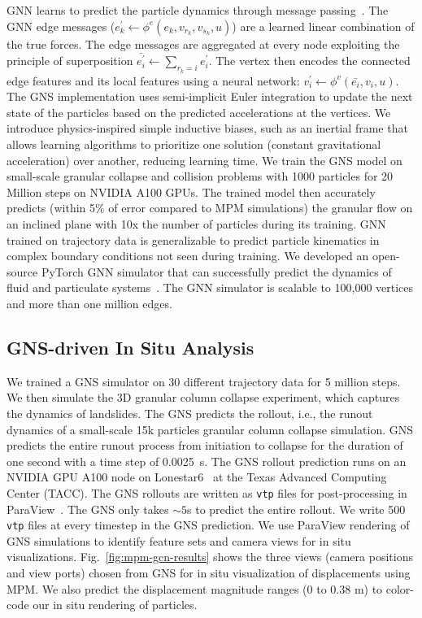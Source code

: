 \documentclass{vgtc}
\newcommand{\code}[1]{\texttt{#1}}
\begin{document}
GNN learns to predict the particle dynamics through message passing~\cite{sanchez2020learning}.  The GNN edge messages  ($e^\prime_k \leftarrow \phi^e(e_k, v_{r_k}, v_{s_k}, u)$) are a learned linear combination of the true forces.  The edge messages are aggregated at every node exploiting the principle of superposition $\bar{e_i^\prime} \leftarrow \sum_{r_k = i} e_i^\prime$.  The vertex then encodes the connected edge features and its local features using a neural network: $v_i^\prime \leftarrow \phi^v (\bar{e_i}, v_i, u)$.  The GNS implementation uses semi-implicit Euler integration to update the next state of the particles based on the predicted accelerations at the vertices.  We introduce physics-inspired simple inductive biases, such as an inertial frame that allows learning algorithms to prioritize one solution (constant gravitational acceleration) over another, reducing learning time.  We train the GNS model on small-scale granular collapse and collision problems with 1000 particles for 20 Million steps on NVIDIA A100 GPUs.  The trained model then accurately predicts (within 5\% of error compared to MPM simulations) the granular flow on an inclined plane with 10x the number of particles during its training.  GNN trained on trajectory data is generalizable to predict particle kinematics in complex boundary conditions not seen during training.  We developed an open-source PyTorch GNN simulator that can successfully predict the dynamics of fluid and particulate systems~\cite{Kumar_Graph_Network_Simulator_2022}.  The GNN simulator is scalable to 100,000 vertices and more than one million edges.


\subsection{GNS-driven In Situ Analysis}


We trained a GNS simulator on 30 different trajectory data for 5 million steps.  We then simulate the 3D granular column collapse experiment, which captures the dynamics of landslides.  The GNS predicts the rollout, i.e., the runout dynamics of a small-scale 15k particles granular column collapse simulation.  GNS predicts the entire runout process from initiation to collapse for the duration of one second with a time step of 0.0025~s.  The GNS rollout prediction runs on an NVIDIA GPU A100 node on  Lonestar6~\cite{lonestar6} at the Texas Advanced Computing Center (TACC).  The GNS rollouts are written as \code{vtp} files for post-processing in ParaView~\cite{ayachit15paraview}.  The GNS only takes $\sim 5$s to predict the entire rollout.  We write 500 \code{vtp} files at every timestep in the GNS prediction.  We use ParaView rendering of GNS simulations to identify feature sets and camera views for in situ visualizations. Fig.~\ref{fig:mpm-gcn-results} shows the three views (camera positions and view ports) chosen from GNS for in situ visualization of displacements using MPM. We also predict the displacement magnitude ranges (0 to 0.38 m) to color-code our in situ rendering of particles.
\end{document}
